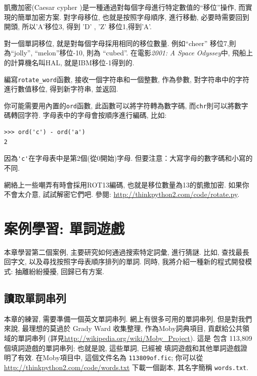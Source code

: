 \documentclass[10pt]{book}
\begin{document}
\begin{exercise}

\label{exrotate}
凱撒加密(Caesar cypher )是一種通過對每個字母進行特定數值的``移位''操作, 
而實現的簡單加密方案. 
對字母移位, 也就是按照字母順序, 進行移動, 必要時需要回到開頭,  
所以'A'移位3, 得到 'D' ,   'Z' 移位1,得到'A'. 

對一個單詞移位, 就是對每個字母採用相同的移位數量. 
例如``cheer'' 移位7,則為``jolly'',  ``melon''移位-10, 則為 ``cubed''. 
在電影{\em 2001: A Space Odyssey}中, 飛船上的計算機名叫HAL, 
就是IBM移位-1得到的. 


編寫\verb"rotate_word"函數, 接收一個字符串和一個整數, 作為參數, 
對字符串中的字符進行數值移位, 得到新字符串, 並返回. 

你可能需要用內置的{\tt ord}函數, 此函數可以將字符轉為數字碼, 
而{\tt chr}則可以將數字碼轉回字符. 
字母表中的字母會按順序進行編碼, 比如:

\begin{verbatim}
>>> ord('c') - ord('a')
2
\end{verbatim}
因為\verb"'c'"在字母表中是第2個(從0開始)字母. 
但要注意：大寫字母的數字碼和小寫的不同. 

網絡上一些嘲弄有時會採用ROT13編碼, 也就是移位數量為13的凱撒加密. 
如果你不會太介意, 試試解密它們吧. 參閱:
\url{http://thinkpython2.com/code/rotate.py}.

\end{exercise}


\chapter{案例學習: 單詞遊戲}
\label{wordplay}

本章學習第二個案例, 主要研究如何通過搜索特定詞彙, 進行猜謎. 
比如, 查找最長回字文, 以及尋找按照字母表順序排列的單詞. 
同時, 我將介紹一種新的程式開發模式: 抽離紛紛擾擾, 回歸已有方案. 


\section{讀取單詞串列}
\label{wordlist}
本章的練習, 需要準備一個英文單詞串列. 
網上有很多可用的單詞串列, 但是對我們來說, 最理想的莫過於
Grady Ward 收集整理, 作為Moby詞典項目, 貢獻給公共領域的單詞串列
(詳見\url{http://wikipedia.org/wiki/Moby_Project}). 這是
包含 113,809 個填詞遊戲的單詞串列; 也就是說, 這些單詞, 已經被
填詞遊戲和其他單詞遊戲證明了有效. 
在Moby項目中, 這個文件名為 {\tt 113809of.fic};
你可以從\url{http://thinkpython2.com/code/words.txt} 下載一個副本, 
其名字簡稱 {\tt words.txt}. 
\end{document}
